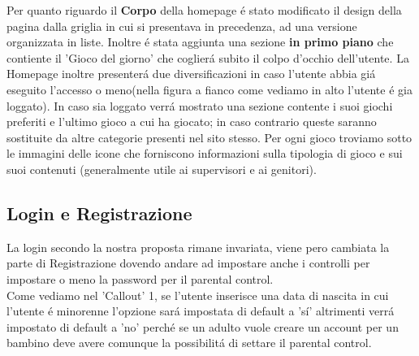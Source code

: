 \documentclass[../Report.tex]{subfiles}
\begin{document}
         Per quanto riguardo il \textbf{Corpo} della homepage  é stato modificato il design della pagina dalla griglia in cui si presentava in precedenza, ad una versione organizzata in liste.
         Inoltre é stata aggiunta una sezione \textbf{in primo piano} che contiente il 'Gioco del giorno' che coglierá subito il colpo d'occhio dell'utente.
         La Homepage inoltre presenterá due diversificazioni in caso l'utente abbia giá eseguito l'accesso o meno(nella figura a fianco come vediamo in alto l'utente é gia loggato).
         In caso sia loggato verrá mostrato una sezione contente i suoi giochi preferiti e l'ultimo gioco a cui ha giocato; in caso contrario queste saranno sostituite da altre categorie presenti nel sito stesso.
         Per ogni gioco troviamo sotto le immagini delle icone che forniscono informazioni sulla tipologia di gioco e sui suoi contenuti (generalmente utile ai supervisori e ai genitori).
         


    \subsection{Login e Registrazione}
    La login secondo la nostra proposta rimane invariata, viene pero cambiata la parte di Registrazione dovendo andare ad impostare anche i controlli per impostare o meno la password per il parental control.\\
    Come vediamo nel 'Callout' 1, se l'utente inserisce una data di nascita in cui l'utente é minorenne l'opzione sará impostata di default a 'sí' altrimenti verrá impostato di default a 'no' perché se un adulto vuole creare un account per un bambino deve avere comunque la possibilitá di settare il parental control.
\end{document}
